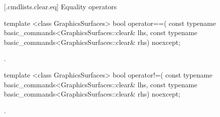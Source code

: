  [\iotwod.cmdlists.clear.eq] {Equality operators}%

%
\begin{itemdecl}
template <class GraphicsSurfaces>
bool operator==(
  const typename basic_commands<GraphicsSurfaces::clear& lhs,
  const typename basic_commands<GraphicsSurfaces::clear& rhs) 
  noexcept;
\end{itemdecl}
\begin{itemdescr}
\pnum
\returns {}.
\end{itemdescr}

%
\begin{itemdecl}
template <class GraphicsSurfaces>
bool operator!=(
  const typename basic_commands<GraphicsSurfaces::clear& lhs,
  const typename basic_commands<GraphicsSurfaces::clear& rhs) 
  noexcept;
\end{itemdecl}
\begin{itemdescr}
\pnum
\returns {}.
\end{itemdescr}
